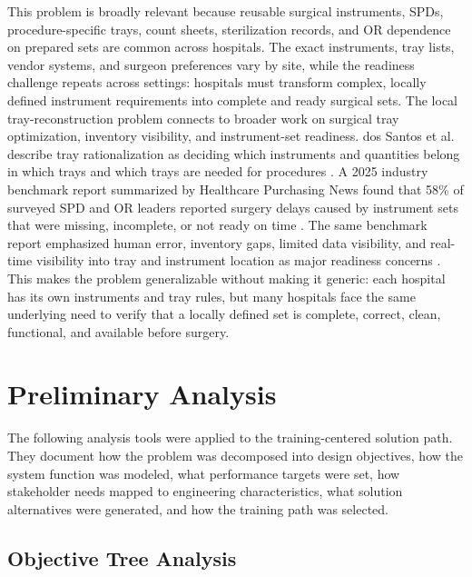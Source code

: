 \documentclass[10pt,a4paper]{article}
\begin{document}
This problem is broadly relevant because reusable surgical instruments, SPDs,
procedure-specific trays, count sheets, sterilization records, and OR
dependence on prepared sets are common across hospitals. The exact instruments,
tray lists, vendor systems, and surgeon preferences vary by site, while the
readiness challenge repeats across settings: hospitals must transform complex,
locally defined instrument requirements into complete and ready surgical sets.
The local tray-reconstruction problem connects to broader work on surgical
tray optimization, inventory visibility, and instrument-set readiness. dos
Santos et al. describe tray rationalization as deciding which instruments and
quantities belong in which trays and which trays are needed for procedures
\cite{dos-santos-et-al-2021}. A 2025
industry benchmark report summarized by Healthcare Purchasing News found that
58\% of surveyed SPD and OR leaders reported surgery delays caused by instrument
sets that were missing, incomplete, or not ready on time
\cite{hpn-2025}.
The same benchmark report emphasized human error, inventory gaps, limited data
visibility, and real-time visibility into tray and instrument location as major
readiness concerns
\cite{aesculap-and-ascendco-health-2025}.
This makes the problem generalizable without making it generic: each hospital
has its own instruments and tray rules, but many hospitals face the same
underlying need to verify that a locally defined set is complete, correct,
clean, functional, and available before surgery.





\section{Preliminary Analysis}
\label{sec:preliminary-analysis}

The following analysis tools were applied to the training-centered solution path.
They document how the problem was decomposed into design objectives, how the
system function was modeled, what performance targets were set, how stakeholder
needs mapped to engineering characteristics, what solution alternatives were
generated, and how the training path was selected.

\subsection{Objective Tree Analysis}
\label{sec:objective-tree-analysis}
\end{document}
